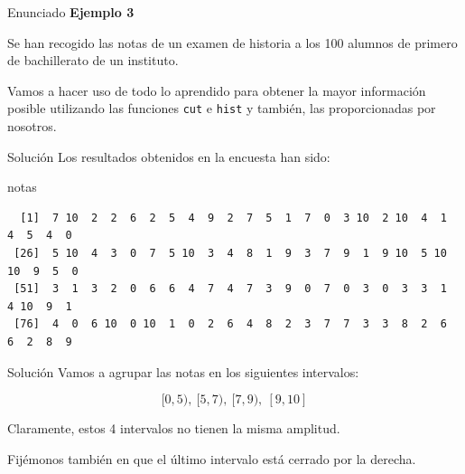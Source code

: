 \documentclass[
  ignorenonframetext,
  aspectratio=169]{beamer}
\newenvironment{Shaded}{\begin{snugshade}}{\end{snugshade}}
\newcommand{\NormalTok}[1]{#1}
\begin{document}
\begin{frame}[fragile]{Enunciado}
\label{enunciado-1}
\textbf{Ejemplo 3}

Se han recogido las notas de un examen de historia a los 100 alumnos de
primero de bachillerato de un instituto.

Vamos a hacer uso de todo lo aprendido para obtener la mayor información
posible utilizando las funciones \texttt{cut} e \texttt{hist} y también,
las proporcionadas por nosotros.
\end{frame}

\begin{frame}[fragile]{Solución}
\label{soluciuxf3n-15}
Los resultados obtenidos en la encuesta han sido:

\begin{Shaded}
\begin{Highlighting}[]
\NormalTok{notas}
\end{Highlighting}
\end{Shaded}

\begin{verbatim}
  [1]  7 10  2  2  6  2  5  4  9  2  7  5  1  7  0  3 10  2 10  4  1  4  5  4  0
 [26]  5 10  4  3  0  7  5 10  3  4  8  1  9  3  7  9  1  9 10  5 10 10  9  5  0
 [51]  3  1  3  2  0  6  6  4  7  4  7  3  9  0  7  0  3  0  3  3  1  4 10  9  1
 [76]  4  0  6 10  0 10  1  0  2  6  4  8  2  3  7  7  3  3  8  2  6  6  2  8  9
\end{verbatim}
\end{frame}

\begin{frame}{Solución}
\label{soluciuxf3n-16}
Vamos a agrupar las notas en los siguientes intervalos:

\[[0,5),\ [5,7),\ [7,9),\ [9,10]\]

Claramente, estos 4 intervalos no tienen la misma amplitud.

Fijémonos también en que el último intervalo está cerrado por la
derecha.
\end{frame}
\end{document}
